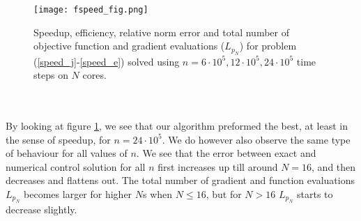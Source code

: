 \begin{figure}[!h]
\centering
\texttt{[image: fspeed\_fig.png]}
\centering
\caption{Speedup, efficiency, relative norm error and total number of objective function and gradient evaluations  ($L_{p_N}$) for problem (\ref{speed_j}-\ref{speed_e}) solved using $n=6\cdot 10^5,12\cdot 10^5,24\cdot 10^5$ time steps on $N$ cores.}
\label{speed_fig1}
\end{figure}
\\
\\
By looking at figure \ref{speed_fig1}, we see that our algorithm preformed the best, at least in the sense of speedup, for $n=24\cdot 10^5$. We do however also observe the same type of behaviour for all values of $n$. We see that the error between exact and numerical control solution for all $n$ first increases up till around $N=16$, and then decreases and flattens out. The total number of gradient and function evaluations $L_{p_N}$ becomes larger for higher $N$s when $N\leq 16$, but for $N>16$ $L_{p_N}$ starts to decrease slightly. 
